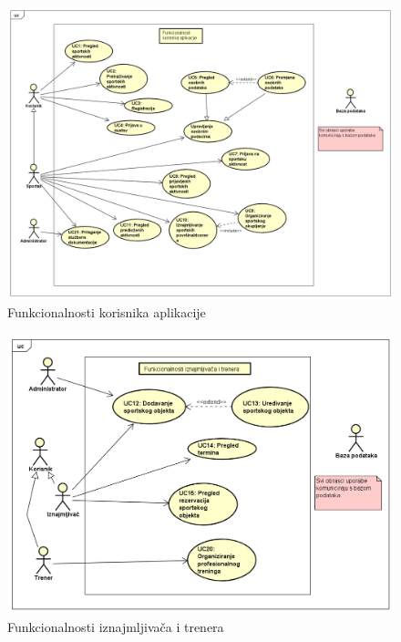 					\begin{figure}[H]
						\includegraphics[width=1\linewidth]{slike/KorisnikSportas.PNG}
						\centering
						\caption{Funkcionalnosti korisnika aplikacije}
						\label{fig:funkcionalnosti_korisnik}
					\end{figure}
					\begin{figure}[H]
						\includegraphics[width=1\linewidth]{slike/IznajmljivacTrener.PNG}
						\centering
						\caption{Funkcionalnosti iznajmljivača i trenera}
						\label{fig:funkcionalnosti_iznajmljivac_trener}
					\end{figure}
